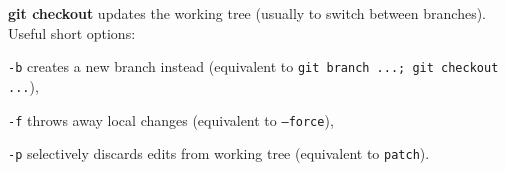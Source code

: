 %

\textbf{git checkout} updates the working tree (usually to switch between branches).
Useful short options:
\begin{compactenum}
\item [\texttt{-b}] creates a new branch instead (equivalent to \texttt{git branch ...; git checkout ...}),
\item [\texttt{-f}] throws away local changes (equivalent to \texttt{--force}),
\item [\texttt{-p}] selectively discards edits from working tree (equivalent to \texttt{patch}).
\end{compactenum}

%